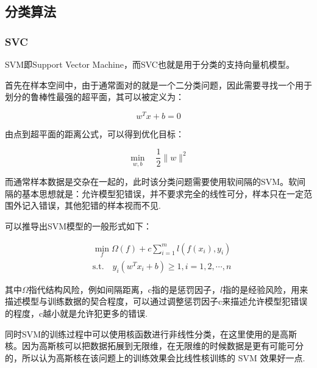 \documentclass[../main.tex]{subfiles}
\begin{document}
    \subsection{分类算法}

        \subsubsection{SVC}

            SVM即Support Vector Machine，而SVC也就是用于分类的支持向量机模型。

            首先在样本空间中，由于通常面对的就是一个二分类问题，因此需要寻找一个用于划分的鲁棒性最强的超平面，其可以被定义为：

            \begin{equation*}
                w^Tx+b = 0
            \end{equation*}

            由点到超平面的距离公式，可以得到优化目标：

            \begin{equation*}
                \min \limits_{w,b} \quad \frac{1}{2} \|w\|^2
            \end{equation*}

            而通常样本数据是交杂在一起的，此时该分类问题需要使用软间隔的SVM。软间隔的基本思想就是：允许模型犯错误，并不要求完全的线性可分，样本只在一定范围外记入错误，其他犯错的样本视而不见.

            可以推导出SVM模型的一般形式如下：

            \begin{equation*}
                \begin{aligned}
                &\min \limits_{f} \Omega(f) + c \sum \limits_{i=1}^m l(f(x_i),y_i)\\
                &\text{s.t.} \quad y_i(w^Tx_i + b) \geqslant 1 , i = 1,2,\cdots,n
                \end{aligned}
            \end{equation*}

            其中$\Omega$指代结构风险，例如间隔距离，c指的是惩罚因子，$l$指的是经验风险，用来描述模型与训练数据的契合程度，可以通过调整惩罚因子c来描述允许模型犯错误的程度，c越小就是允许犯更多的错误.

            同时SVM的训练过程中可以使用核函数进行非线性分类，在这里使用的是高斯核。因为高斯核可以把数据拓展到无限维，在无限维的时候数据是更有可能可分的，所以认为高斯核在该问题上的训练效果会比线性核训练的 SVM 效果好一点.
\end{document}
